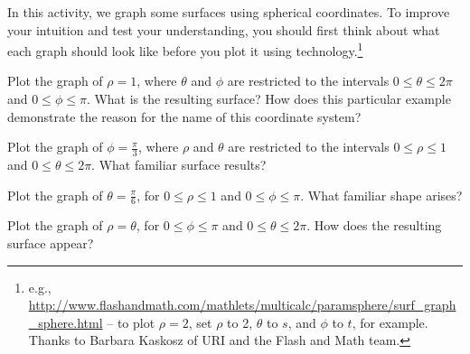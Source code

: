 \begin{activity} \label{A:11.8.7} In this activity, we graph some surfaces using spherical coordinates. To improve your intuition and test your understanding, you should first think about what each graph should look like before you plot it using technology.\footnote{e.g., \url{http://www.flashandmath.com/mathlets/multicalc/paramsphere/surf_graph_sphere.html} -- to plot $\rho=2$, set $\rho$ to 2, $\theta$ to $s$, and $\phi$ to $t$, for example. Thanks to Barbara Kaskosz of URI and the Flash and Math team.}
    \ba
    \item Plot the graph of $\rho = 1$, where $\theta$ and $\phi$ are restricted to the intervals  $0 \leq \theta \leq 2\pi$ and $0 \leq \phi \leq \pi$. What is the resulting surface? How does this particular example demonstrate the reason for the name of this coordinate system?

    \item Plot the graph of $\phi = \frac{\pi}{3}$, where $\rho$ and $\theta$ are restricted to the intervals $0 \leq \rho \leq 1$ and $0 \leq \theta \leq 2\pi$. What familiar surface results?

    \item Plot the graph of $\theta = \frac{\pi}{6}$, for $0 \leq \rho \leq 1$ and $0 \leq \phi \leq \pi$. What familiar shape arises?

    \item Plot the graph of $\rho = \theta$, for $0 \leq \phi \leq \pi$ and $0 \leq \theta \leq 2 \pi$. How does the resulting surface appear?



    \ea

\end{activity}
\begin{smallhint}

\end{smallhint}
\begin{bighint}

\end{bighint}
